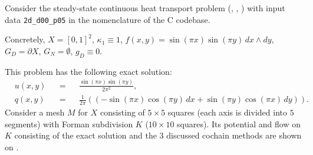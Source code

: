 \begin{example}
  Consider the steady-state continuous heat transport problem
  (,
   ,
   )
  with input data \verb|2d_d00_p05| in the nomenclature of the C codebase.

  Concretely,
    $X = [0, 1]^2$,
    $\kappa_1 \equiv 1$,
    $f(x, y) = \sin(\pi x) \sin(\pi y) \, d x \wedge d y$,
    $G_D = \partial X$,
    $G_N = \emptyset$,
    $g_D \equiv 0$.

  This problem has the following exact solution:
  \begin{subequations}
    \begin{alignat}{3}
      & u(x, y) && = && \frac{\sin(\pi x) \sin(\pi y)}{2 \pi^2}, \\
      & q(x, y) && = &&
        \frac{1}{2 \pi}
        ((- \sin(\pi x) \cos(\pi y) \, d x + \sin(\pi y) \cos(\pi x)\, d y)).
    \end{alignat}
  \end{subequations}
  Consider a mesh $M$ for $X$ consisting of $5 \times 5$ squares (each axis is
  divided into $5$ segments) with Forman subdivision $K$
  ($10 \times 10$ squares).
  Its potential and flow on $K$ consisting of the exact solution and the $3$
  discussed cochain methods are shown on
  .
\end{example}
